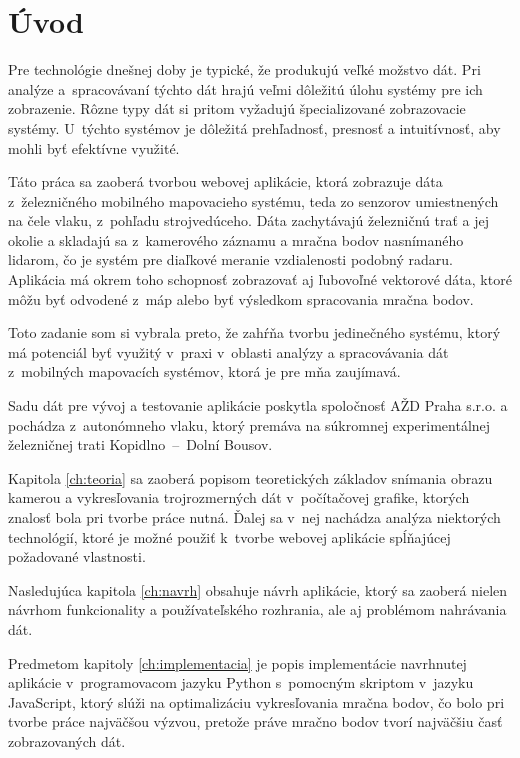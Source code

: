 %

\chapter{Úvod}

Pre technológie dnešnej doby je typické, že produkujú veľké možstvo dát. Pri analýze a~spracovávaní týchto dát hrajú veľmi dôležitú úlohu systémy pre ich zobrazenie. Rôzne typy dát si pritom vyžadujú špecializované zobrazovacie systémy. U~týchto systémov je dôležitá prehľadnosť, presnosť a intuitívnosť, aby mohli byť efektívne využité.

Táto práca sa zaoberá tvorbou webovej aplikácie, ktorá zobrazuje dáta z~železničného mobilného mapovacieho systému, teda zo senzorov umiestnených na čele vlaku, z~pohľadu strojvedúceho. Dáta zachytávajú železničnú trať a jej okolie a skladajú sa z~kamerového záznamu a mračna bodov nasnímaného lidarom, čo je systém pre diaľkové meranie vzdialenosti podobný radaru. Aplikácia má okrem toho schopnosť zobrazovať aj ľubovoľné vektorové dáta, ktoré môžu byť odvodené z~máp alebo byť výsledkom spracovania mračna bodov.

Toto zadanie som si vybrala preto, že zahŕňa tvorbu jedinečného systému, ktorý má potenciál byť využitý v~praxi v~oblasti analýzy a spracovávania dát z~mobilných mapovacích systémov, ktorá je pre mňa zaujímavá.

Sadu dát pre vývoj a testovanie aplikácie poskytla spoločnosť AŽD Praha s.r.o. a pochádza z~autonómneho vlaku, ktorý premáva na súkromnej experimentálnej železničnej trati Kopidlno~--~Dolní Bousov.

Kapitola \ref{ch:teoria} sa zaoberá popisom teoretických základov snímania obrazu kamerou a vykresľovania trojrozmerných dát v~počítačovej grafike, ktorých znalosť bola pri tvorbe práce nutná. Ďalej sa v~nej nachádza analýza niektorých technológií, ktoré je možné použiť k~tvorbe webovej aplikácie spĺňajúcej požadované vlastnosti.

Nasledujúca kapitola \ref{ch:navrh} obsahuje návrh aplikácie, ktorý sa zaoberá nielen návrhom funkcionality a používateľského rozhrania, ale aj problémom nahrávania dát.

Predmetom kapitoly \ref{ch:implementacia} je popis implementácie navrhnutej aplikácie v~programovacom jazyku Python s~pomocným skriptom v~jazyku JavaScript, ktorý slúži na optimalizáciu vykresľovania mračna bodov, čo bolo pri tvorbe práce najväčšou výzvou, pretože práve mračno bodov tvorí najväčšiu časť zobrazovaných dát.

